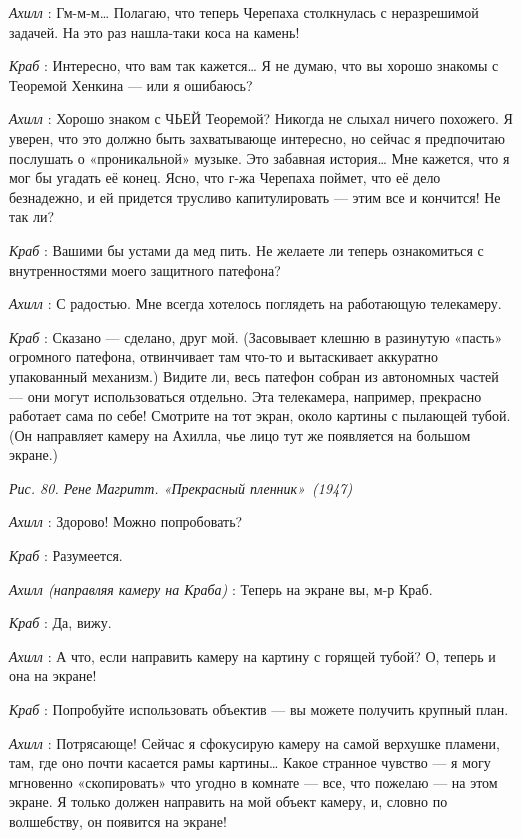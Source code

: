 \documentclass[../main.tex]{subfiles}
\begin{document}
\begin{dialogue}
\emph{Ахилл} : Гм-м-м\ldots{} Полагаю, что теперь Черепаха столкнулась с неразрешимой задачей. На это раз нашла-таки коса на камень!

\emph{Краб} : Интересно, что вам так кажется\ldots{} Я не думаю, что вы хорошо знакомы с Теоремой Хенкина --- или я ошибаюсь?

\emph{Ахилл} : Хорошо знаком с ЧЬЕЙ Теоремой? Никогда не слыхал ничего похожего. Я уверен, что это должно быть захватывающе интересно, но сейчас я предпочитаю послушать о «проникальной» музыке. Это забавная история\ldots{} Мне кажется, что я мог бы угадать её конец. Ясно, что г-жа Черепаха поймет, что её дело безнадежно, и ей придется трусливо капитулировать --- этим все и кончится! Не так ли?

\emph{Краб} : Вашими бы устами да мед пить. Не желаете ли теперь ознакомиться с внутренностями моего защитного патефона?

\emph{Ахилл} : С радостью. Мне всегда хотелось поглядеть на работающую телекамеру.

\emph{Краб} : Сказано --- сделано, друг мой. (Засовывает клешню в разинутую «пасть» огромного патефона, отвинчивает там что-то и вытаскивает аккуратно упакованный механизм.) Видите ли, весь патефон собран из автономных частей --- они могут использоваться отдельно. Эта телекамера, например, прекрасно работает сама по себе! Смотрите на тот экран, около картины с пылающей тубой. (Он направляет камеру на Ахилла, чье лицо тут же появляется на большом экране.)

\emph{Рис. 80. Рене Магритт. «Прекрасный пленник»~(1947)}

\emph{Ахилл} : Здорово! Можно попробовать?

\emph{Краб} : Разумеется.

\emph{Ахилл (направляя камеру на Краба)} : Теперь на экране вы, м-р Краб.

\emph{Краб} : Да, вижу.

\emph{Ахилл} : А что, если направить камеру на картину с горящей тубой? О, теперь и она на экране!

\emph{Краб} : Попробуйте использовать объектив --- вы можете получить крупный план.

\emph{Ахилл} : Потрясающе! Сейчас я сфокусирую камеру на самой верхушке пламени, там, где оно почти касается рамы картины\ldots{} Какое странное чувство --- я могу мгновенно «скопировать» что угодно в комнате --- все, что пожелаю --- на этом экране. Я только должен направить на мой объект камеру, и, словно по волшебству, он появится на экране!


\end{dialogue}
\end{document}
